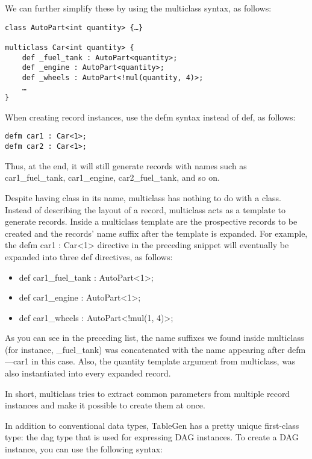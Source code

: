 We can further simplify these by using the multiclass syntax, as follows:

\begin{lstlisting}[style=styleCXX]
class AutoPart<int quantity> {…}

multiclass Car<int quantity> {
	def _fuel_tank : AutoPart<quantity>;
	def _engine : AutoPart<quantity>;
	def _wheels : AutoPart<!mul(quantity, 4)>;
	…
}
\end{lstlisting}

When creating record instances, use the defm syntax instead of def, as follows:

\begin{lstlisting}[style=styleCXX]
defm car1 : Car<1>;
defm car2 : Car<1>;
\end{lstlisting}

Thus, at the end, it will still generate records with names such as car1\_fuel\_tank, car1\_engine, car2\_fuel\_tank, and so on.

Despite having class in its name, multiclass has nothing to do with a class. Instead of describing the layout of a record, multiclass acts as a template to generate records. Inside a multiclass template are the prospective records to be created and the records' name suffix after the template is expanded. For example, the defm car1 : Car<1> directive in the preceding snippet will eventually be expanded into three def directives, as follows:

\begin{itemize}
\item def car1\_fuel\_tank : AutoPart<1>;
\item def car1\_engine : AutoPart<1>;
\item def car1\_wheels : AutoPart<!mul(1, 4)>;
\end{itemize}

As you can see in the preceding list, the name suffixes we found inside multiclass (for instance, \_fuel\_tank) was concatenated with the name appearing after defm—car1 in this case. Also, the quantity template argument from multiclass, was also instantiated into every expanded record.

In short, multiclass tries to extract common parameters from multiple record instances and make it possible to create them at once.


In addition to conventional data types, TableGen has a pretty unique first-class type: the dag type that is used for expressing DAG instances. To create a DAG instance, you can use the following syntax:

